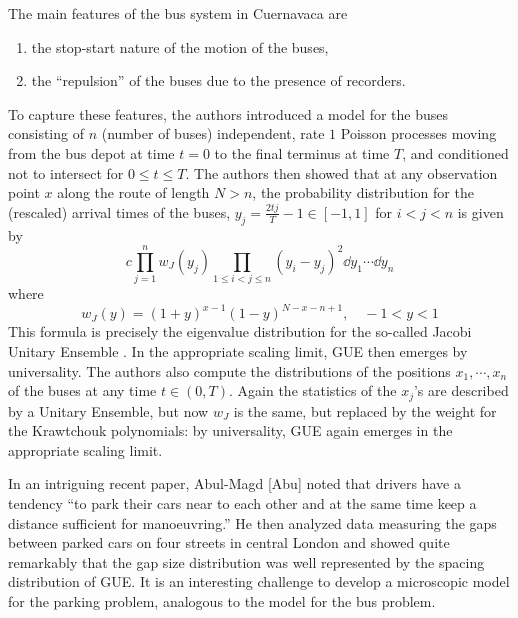 The main features of the bus system in Cuernavaca are
\begin{enumerate}
	\item the stop-start nature of the motion of the buses,
	\item the “repulsion” of the buses due to the presence of recorders.
\end{enumerate}
To capture these features, the authors introduced a model for the buses consisting of $n$ (number of buses) independent, rate $1$ Poisson processes moving from the bus depot at time $t = 0$ to the final terminus at time $T$, and conditioned not to intersect for $0 \leq t \leq T$. The authors then showed that at any observation point $x$ along the route of length $N > n$, the probability distribution for the (rescaled) arrival times of the buses, $y_j = \frac{2tj}{T} - 1 \in [-1, 1]$ for $i < j < n$ is given by
\begin{equation}
	c \prod_{j=1}^{n} w_J(y_j) \prod_{1 \leq i < j \leq n} (y_i - y_j)^2 \dd y_1 \cdots \dd y_n
\end{equation}
where
\begin{equation}
	w_J(y) = (1 + y)^{x-1} (1 - y)^{N-x-n+1}, \quad -1 < y < 1
\end{equation}
This formula is precisely the eigenvalue distribution for the so-called Jacobi Unitary Ensemble . In the appropriate scaling limit, GUE then emerges by universality. The authors also compute the distributions of the positions $x_1, \cdots , x_n$ of the buses at any time $t \in (0, T)$. Again the statistics of the $x_j$’s are described by a Unitary Ensemble, but now $w_J$ is the same, but replaced by the weight for the Krawtchouk polynomials: by universality, GUE again emerges in the appropriate scaling limit.

In an intriguing recent paper, Abul-Magd [Abu] noted that drivers have a tendency “to park their cars near to each other and at the same time keep a distance sufficient for manoeuvring.” He then analyzed data measuring the gaps between parked cars on four streets in central London and showed quite remarkably that the gap size distribution was well represented by the spacing distribution of GUE. It is an interesting challenge to develop a microscopic model for the parking problem, analogous to the model for the bus problem.